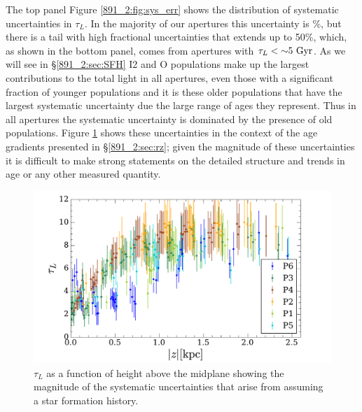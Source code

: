 The top panel Figure \ref{891_2:fig:sys_err} shows the distribution of
systematic uncertainties in $\tau_L$. In the majority of our apertures
this uncertainty is \%, but there is a tail with high
fractional uncertainties that extends up to 50\%, which, as shown in
the bottom panel, comes from apertures with $\tau_L < {\sim}
  5~\mathrm{Gyr} $. As we will see in \S\ref{891_2:sec:SFH} I2 and O populations
make up the largest contributions to the total light in all apertures,
even those with a significant fraction of younger populations and it
is these older populations that have the largest systematic
uncertainty due the large range of ages they represent. Thus in all
apertures the systematic uncertainty is dominated by the presence of
old populations. Figure \ref{891_2:fig:MLWA_sys_err} shows these
uncertainties in the context of the age gradients presented in
\S\ref{891_2:sec:rz}; given the magnitude of these uncertainties it is
difficult to make strong statements on the detailed structure and
trends in age or any other measured quantity.


\begin{figure}
  \centering
  \includegraphics[width=\columnwidth]{891_2/figs/MLWA_sys_err.pdf}
  \caption[Systematic $\tau_L$ uncertaities in relation to our data]
          {\fixspacing\label{891_2:fig:MLWA_sys_err}$\tau_L$ as a
            function of height above the midplane showing the
            magnitude of the systematic uncertainties that arise from
            assuming a star formation history.}
\end{figure}

